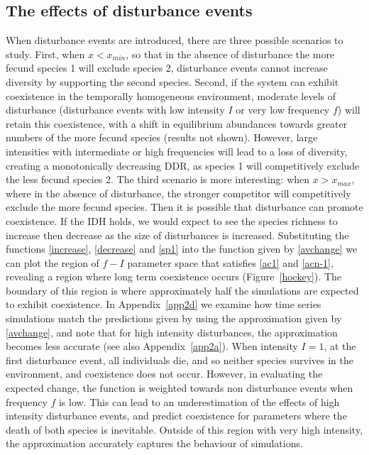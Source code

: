 \subsection{The effects of disturbance events} \label{ss:resultsdist}
When disturbance events are introduced, there are three possible scenarios to study. First, when $x<x_{min}$, so that in the absence of disturbance the more fecund species 1 will exclude species 2, disturbance events cannot increase diversity by supporting the second species. Second, if the system can exhibit coexistence in the temporally homogeneous environment, moderate levels of disturbance (disturbance events with low intensity $I$ or very low frequency $f$) will retain this coexistence, with a shift in equilibrium abundances towards greater numbers of the more fecund species (results not shown). However, large intensities with intermediate or high frequencies will lead to a loss of diversity, creating a monotonically decreasing DDR, as species 1 will competitively exclude the less fecund species 2. The third scenario is more interesting: when $x>x_{max}$, where in the absence of disturbance, the stronger competitor will competitively exclude the more fecund species. Then it is possible that disturbance can promote coexistence. If the IDH holds, we would expect to see the species richness to increase then decrease as the size of disturbances is increased. Substituting the functions \eqref{increase}, \eqref{decrease} and \eqref{sp1} into the function given by \eqref{avchange} we can plot the region of $f-I$ parameter space that satisfies \eqref{ac1} and \eqref{acn-1}, revealing a region where long term coexistence occurs (Figure~\ref{hockey}).  The boundary of this region is where approximately half the simulations are expected to exhibit coexistence. In Appendix~\ref{app2d} we examine how time series simulations match the predictions given by using the approximation given by \eqref{avchange}, and note that for high intensity disturbances, the approximation becomes less accurate (see also Appendix~\ref{app2a}). When intensity $I=1$, at the first disturbance event, all individuals die, and so neither species survives in the environment, and coexistence does not occur. However, in evaluating the expected change, the function is weighted towards non disturbance events when frequency $f$ is low. This can lead to an underestimation of the effects of high intensity disturbance events, and predict coexistence for parameters where the death of both species is inevitable.
 Outside of this region with very high intensity, the approximation accurately captures the behaviour of simulations.

